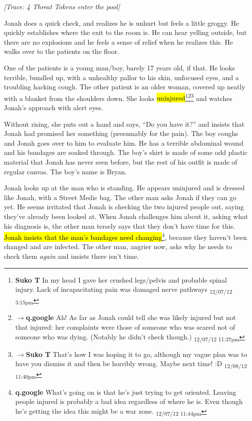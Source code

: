 \textit{{[}Trace: 4 Threat Tokens enter the pool{]}}



Jonah does a quick check, and realizes he is unhurt but feels a little groggy.  He quickly establishes where the exit to the room is.  He can hear yelling outside, but there are no explosions and he feels a sense of relief when he realizes this.  He walks over to the patients on the floor.



One of the patients is a young man/boy, barely 17 years old, if that.  He looks terrible, bundled up, with a unhealthy pallor to his skin, unfocused eyes, and a troubling hacking cough.  The other patient is an older woman, covered up neatly with a blanket from the shoulders down.  She looks \hl{uninjured}\footnote{\textbf{Suko T }In my head I gave her crushed legs/pelvis and probable spinal injury.  Lack of incapacitating pain was damaged nerve pathways \textsubscript{12/07/12 3:15pm}}\footnote{$\rightarrow$\textbf{q.google }Ah!  As far as Jonah could tell she was likely injured but not that injured: her complaints were those of someone who was scared not of someone who was dying.  (Notably he didn't check though.) \textsubscript{12/07/12 11:37pm}}\footnote{$\rightarrow$\textbf{Suko T }That's how I was hoping it to go, although my vague plan was to have you dismiss it and then be horribly wrong.  Maybe next time! :D \textsubscript{12/08/12 11:40pm}} and watches Jonah's approach with alert eyes.



Without rising, she puts out a hand and says, ``Do you have it?'' and insists that Jonah had promised her something (presumably for the pain).  The boy coughs and Jonah goes over to him to evaluate him. He has a terrible abdominal wound and his bandages are soaked through.  The boy's shirt is made of some odd plastic material that Jonah has never seen before, but the rest of his outfit is made of regular canvas. The boy's name is Bryan.



Jonah looks up at the man who is standing.  He appears uninjured and is dressed like Jonah, with a Street Medic bag.  The other man asks Jonah if they can go yet.  He seems irritated that Jonah is checking the two injured people out, saying they've already been looked at.  When Jonah challenges him about it, asking what his diagnosis is, the other man tersely says that they don't have time for this.  \hl{Jonah insists that the man's bandages need changing}\footnote{\textbf{q.google }What's going on is that he's just trying to get oriented.  Leaving people injured is probably a bad idea regardless of where he is.  Even though he's getting the idea this might be a war zone. \textsubscript{12/07/12 11:44pm}}, because they haven't been changed and are infected.  The other man, angrier now, asks why he needs to check them \textit{again} and insists there isn't time.



